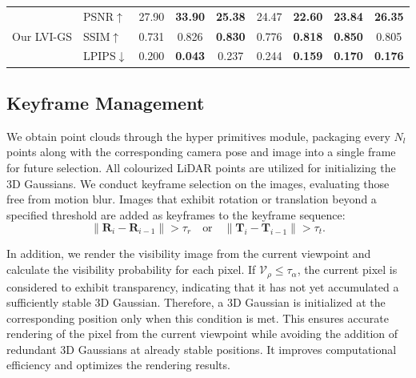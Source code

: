 \documentclass[lettersize,journal]{IEEEtran}
\begin{document}
\begin{table}[!p]
\begin{tabular}{@{}llccccccc@{}}
        \midrule
        \multirow{3}{*}{Our LVI-GS} & PSNR$\uparrow$ & 27.90 & \textbf{33.90} & \textbf{25.38} & 24.47 & \textbf{22.60} & \textbf{23.84} & \textbf{26.35} \\
        & SSIM$\uparrow$ & 0.731 & 0.826 & \textbf{0.830} & 0.776 & \textbf{0.818} & \textbf{0.850} & 0.805 \\
        & LPIPS$\downarrow$ & 0.200 & \textbf{0.043} & 0.237 & 0.244 & \textbf{0.159} & \textbf{0.170} & \textbf{0.176} \\
        \bottomrule
    \end{tabular}
    \captionsetup{justification=centering, labelsep=colon} %
    \vfill %
\end{table}
\clearpage %


\subsection{Keyframe Management}

We obtain point clouds through the hyper primitives module, packaging every $N_l$ points along with the corresponding camera pose and image into a single frame for future selection. All colourized LiDAR points are utilized for initializing the 3D Gaussians. We conduct keyframe selection on the images, evaluating those free from motion blur. Images that exhibit rotation or translation beyond a specified threshold are added as keyframes to the keyframe sequence:
\begin{equation}
\left\lVert \mathbf{R}_i - \mathbf{R}_{i-1} \right\rVert > \tau_r \quad \text{or} \quad \left\lVert \mathbf{T}_i - \mathbf{T}_{i-1} \right\rVert > \tau_t.
\label{eq:threshold}
\end{equation}

In addition, we render the visibility image from the current viewpoint and calculate the visibility probability for each pixel. If $\mathcal{V}_{\rho} \leq \tau_{\alpha}$, the current pixel is considered to exhibit transparency, indicating that it has not yet accumulated a sufficiently stable 3D Gaussian. Therefore, a 3D Gaussian is initialized at the corresponding position only when this condition is met. This ensures accurate rendering of the pixel from the current viewpoint while avoiding the addition of redundant 3D Gaussians at already stable positions. It improves computational efficiency and optimizes the rendering results.
\end{document}
